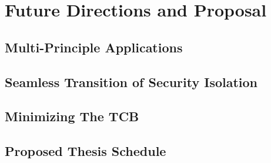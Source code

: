 \chapter{Future Directions and Proposal}

\section{Multi-Principle Applications}

\section{Seamless Transition of Security Isolation}

\section{Minimizing The TCB}

\section{Proposed Thesis Schedule}